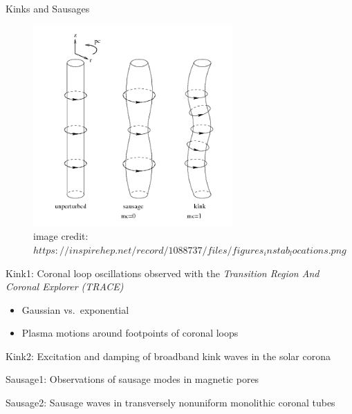 \documentclass[table]{beamer}
\begin{document}
\begin{frame}{Kinks and Sausages}
    \begin{figure}
        \includegraphics[width=3in]{kink_saus.png}
        \caption*{\tiny image credit:
            $https://inspirehep.net/record/1088737/files/figures_instab_locations.png$}
    \end{figure}
\end{frame}


\begin{frame}{Kink1: Coronal loop oscillations observed with the
        \emph{Transition Region And Coronal Explorer (TRACE)}}
    \begin{itemize}
        \item Gaussian vs.\ exponential
        \item Plasma motions around footpoints of coronal loops
    \end{itemize}
\end{frame}

\begin{frame}{Kink2: Excitation and damping of broadband kink waves
    in the solar corona}
\end{frame}

\begin{frame}{Sausage1: Observations of sausage modes in magnetic pores}
\end{frame}

\begin{frame}{Sausage2: Sausage waves in transversely nonuniform
    monolithic coronal tubes}
\end{frame}
\end{document}
